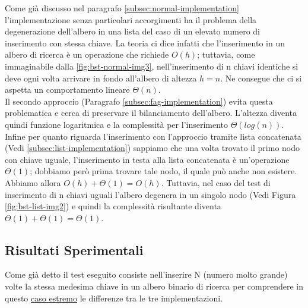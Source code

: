 \documentclass{article}
\begin{document}
Come già discusso nel paragrafo \ref{subsec:normal-implementation} l'implementazione senza particolari accorgimenti ha il problema della degenerazione dell'albero in una lista del caso di un elevato numero di inserimento con stessa chiave.
La teoria ci dice infatti che l'inserimento in un albero di ricerca è un operazione che richiede $O(h)$; tuttavia, come immaginabile dalla \cref{fig:bst-normal-img3}, nell'inserimento di n chiavi identiche si deve ogni volta arrivare in fondo all'albero di altezza $h=n$. Ne consegue che ci si aspetta un comportamento lineare $\Theta(n)$.
\\
Il secondo approccio (Paragrafo \ref{subsec:fag-implementation}) evita questa problematica e cerca di preservare il bilanciamento dell'albero. L'altezza diventa quindi funzione logaritmica e la complessità  per l'inserimento $\Theta(log(n))$.
\\
Infine per quanto riguarda l'inserimento con l'approccio tramite lista concatenata (Vedi \ref{subsec:list-implementation}) sappiamo che una volta trovato il primo nodo con chiave uguale, l'inserimento in testa alla lista concatenata è un'operazione $\Theta(1)$; dobbiamo però prima trovare tale nodo, il quale può anche non esistere. Abbiamo allora $O(h) + \Theta(1) = O(h)$. 
Tuttavia, nel caso del test di inserimento di n chiavi uguali l'albero degenera in un singolo nodo (Vedi Figura \ref{fig:bst-list-img2}) e quindi la complessità risultante diventa $\Theta(1) + \Theta(1) = \Theta(1)$.


\subsection{Risultati Sperimentali}

Come già detto il test eseguito consiste nell'inserire N (numero molto grande) volte la stessa medesima chiave in un albero binario di ricerca per comprendere in questo \underline{caso estremo} le differenze tra le tre implementazioni.
\end{document}
